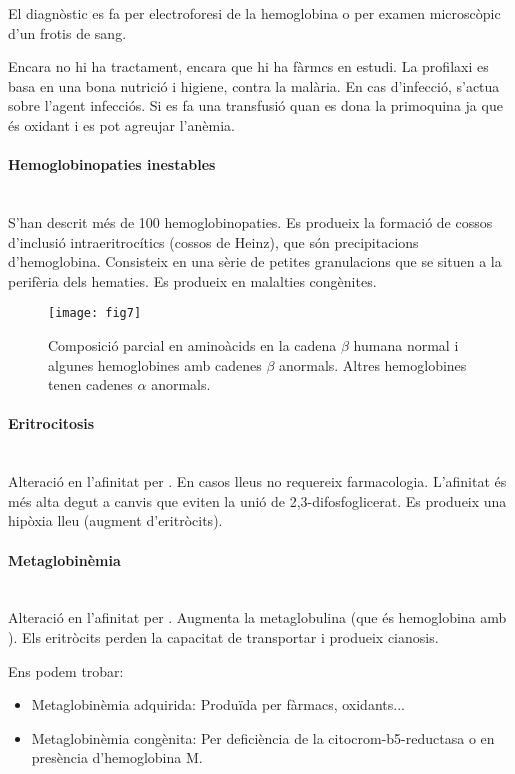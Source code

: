 El diagnòstic es fa per electroforesi de la hemoglobina o per examen
microscòpic d'un frotis de sang.

Encara no hi ha tractament, encara que hi ha fàrmcs en estudi. La
profilaxi es basa en una bona nutrició i higiene, contra la
malària. En cas d'infecció, s'actua sobre l'agent infecciós. Si es fa
una transfusió quan es dona la primoquina ja que és oxidant i es pot
agreujar l'anèmia.

\paragraph{Hemoglobinopaties inestables} \hfill \\
S'han descrit més de 100 hemoglobinopaties. Es produeix la formació de
cossos d'inclusió intraeritrocítics (cossos de Heinz), que són
precipitacions d'hemoglobina. Consisteix en una sèrie de petites
granulacions que se situen a la perifèria dels hematies. Es produeix
en malalties congènites.

\begin{figure}[H]
  \centering
  \texttt{[image: fig7]}
  \caption{Composició parcial en aminoàcids en la cadena $\beta$ humana
    normal i algunes hemoglobines amb cadenes $\beta$ anormals. Altres
    hemoglobines tenen cadenes $\alpha$ anormals.}
  \label{fig:fig7}
\end{figure}

\paragraph{Eritrocitosis} \hfill \\
Alteració en l'afinitat per . En casos lleus no requereix
farmacologia. L'afinitat és més alta degut a canvis que eviten la unió
de 2,3-difosfoglicerat. Es produeix una hipòxia lleu (augment
d'eritròcits).

\paragraph{Metaglobinèmia} \hfill \\
Alteració en l'afinitat per . Augmenta la metaglobulina (que és
hemoglobina amb ). Els eritròcits perden la capacitat de
transportar  i produeix cianosis.

Ens podem trobar:
\begin{itemize}
\item Metaglobinèmia adquirida: Produïda per fàrmacs, oxidants...

\item Metaglobinèmia congènita: Per deficiència de la
  citocrom-b5-reductasa o en presència d'hemoglobina M.
\end{itemize}

